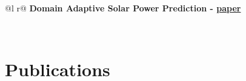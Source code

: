 \documentclass[a4paper,7 pt]{article}
\begin{document}
\begin{tabularx}{\linewidth}{ @{}l r@{} }
\textbf{Domain Adaptive Solar Power Prediction -  \href{https://ieeexplore.ieee.org/abstract/document/10407265?casa_token=XJ3KYmxIrswAAAAA:l0OZrlJg36z_QRhukx2hxqQqFvHKQJom0pAFiDlTVVURLNgjfel5LveVzR8Af2Ec8m_5BAs9}{paper}} \\
\end{tabularx}

\\






\section{Publications}
\end{document}
